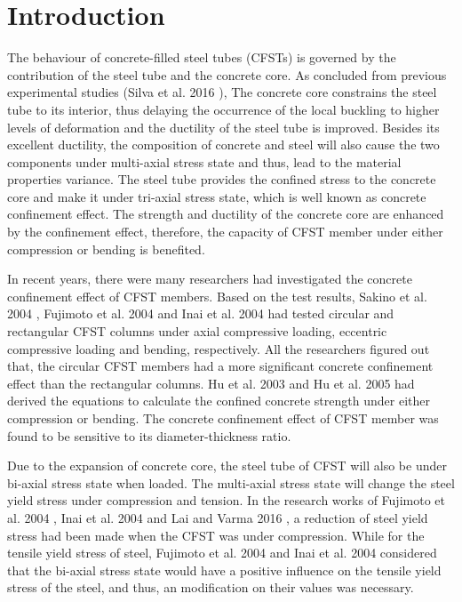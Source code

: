 \documentclass[12pt, A4]{article}
\begin{document}
	\section{Introduction}
	The behaviour of concrete-filled steel tubes (CFSTs) is governed by the contribution of the steel tube and the concrete core. As concluded from previous experimental studies (Silva et al. 2016 \cite{Silva2016}), The concrete core constrains the steel tube to its interior, thus delaying the occurrence of the local buckling to higher levels of deformation and the ductility of the steel tube is improved. Besides its excellent ductility, the composition of concrete and steel will also cause the two components under multi-axial stress state and thus, lead to the material properties variance. The steel tube provides the confined stress to the concrete core and make it under tri-axial stress state, which is well known as concrete confinement effect. The strength and ductility of the concrete core are enhanced by the confinement effect, therefore, the capacity of CFST member under either compression or bending is benefited.
	\par
	In recent years, there were many researchers had investigated the concrete confinement effect of CFST members. Based on the test results, Sakino et al. 2004 \cite{RN41}, Fujimoto et al. 2004 \cite{RN15} and Inai et al. 2004 \cite{RN30} had tested circular and rectangular CFST columns under axial compressive loading, eccentric compressive loading and bending, respectively. All the researchers figured out that, the circular CFST members had a more significant concrete confinement effect than the rectangular columns. Hu et al. 2003 \cite{RN1} and Hu et al. 2005 \cite{RN29} had derived the equations to calculate the confined concrete strength under either compression or bending. The concrete confinement effect of CFST member was found to be sensitive to its diameter-thickness ratio.
	\par
	Due to the expansion of concrete core, the steel tube of CFST will also be under bi-axial stress state when loaded. The multi-axial stress state will change the steel yield stress under compression and tension. In the research works of Fujimoto et al. 2004 \cite{RN15}, Inai et al. 2004 \cite{RN30} and Lai and Varma 2016 \cite{RN32}, a reduction of steel yield stress had been made when the CFST was under compression. While for the tensile yield stress of steel, Fujimoto et al. 2004 \cite{RN15} and Inai et al. 2004 \cite{RN30} considered that the bi-axial stress state would have a positive influence on the tensile yield stress of the steel, and thus, an modification on their values was necessary.
\end{document}
